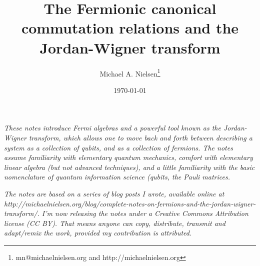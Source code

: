 \documentclass[12pt]{article}
\begin{document}
\title{The Fermionic canonical commutation relations and the
  Jordan-Wigner transform} 

\author{Michael A. Nielsen\thanks{mn@michaelnielsen.org and
    http://michaelnielsen.org} }

\date{\today}

\maketitle

\emph{These notes introduce Fermi algebras and a powerful tool known
  as the Jordan-Wigner transform, which allows one to move back and
  forth between describing a system as a collection of qubits, and as
  a collection of fermions.  The notes assume familiarity with
  elementary quantum mechanics, comfort with elementary linear algebra
  (but not advanced techniques), and a little familiarity with the
  basic nomenclature of quantum information science (qubits, the Pauli
  matrices.}

\emph{The notes are based on a series of blog posts I wrote, available
  online at
  http://michaelnielsen.org/blog/complete-notes-on-fermions-and-the-jordan-wigner-transform/.
  I'm now releasing the notes under a Creative Commons Attribution
  license (CC BY).  That means anyone can copy,
  distribute, transmit and adapt/remix the work, provided my
  contribution is attributed.}


\end{document}
